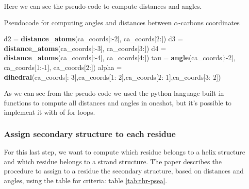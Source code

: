 Here we can see the pseudo-code to compute distances and angles.

\begin{algorithm}[ht]
    \caption{Pseudocode for computing angles and distances between $\alpha$-carbons coordinates}\label{alg:two}
    \begin{algorithmic}
        
        \STATE d2 = \textbf{distance\_atoms}(ca\_coords[:-2], ca\_coords[2:])
        \STATE d3 = \textbf{distance\_atoms}(ca\_coords[:-3], ca\_coords[3:])
        \STATE d4 = \textbf{distance\_atoms}(ca\_coords[:-4], ca\_coords[4:])
        \STATE tau = \textbf{angle}(ca\_coords[:-2], ca\_coords[1:-1], ca\_coords[2:])
        \STATE alpha = \textbf{dihedral}(ca\_coords[:-3],ca\_coords[1:-2],ca\_coords[2:-1],ca\_coords[3:-2])
    \end{algorithmic}
\end{algorithm}

As we can see from the pseudo-code we used the python language built-in functions to compute all distances and angles in oneshot, but it's possible to implement it with of for loops.

\subsubsection{Assign secondary structure to each residue}
For this last step, we want to compute which residue belongs to a helix structure and which residue belongs to a strand structure.
The paper describes the procedure to assign to a residue the secondary structure, based on distances and angles, using the table for criteria: table \ref{tab:thr-psea}.

